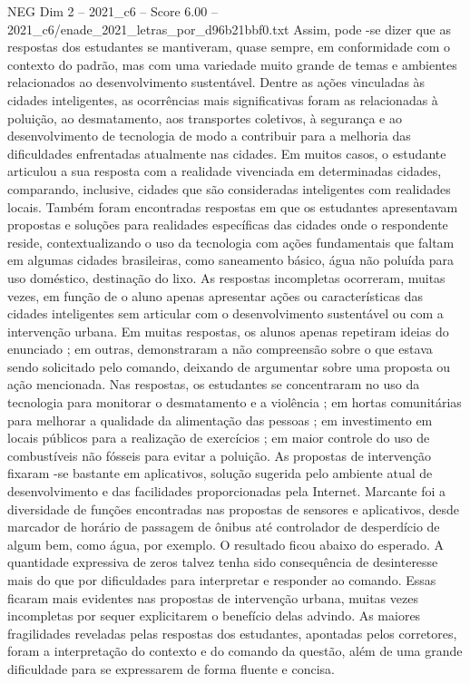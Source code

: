 \begin{textsample}{NEG Dim 2 – 2021\_c6 – Score 6.00 – 2021\_c6/enade\_2021\_letras\_por\_d96b21bbf0.txt}
Assim, pode -se dizer que as respostas dos estudantes se mantiveram, quase sempre, em conformidade com o contexto do padrão, mas com uma variedade muito grande de temas e ambientes relacionados ao desenvolvimento sustentável.
Dentre as ações vinculadas às cidades inteligentes, as ocorrências mais significativas foram as relacionadas à poluição, ao desmatamento, aos transportes coletivos, à segurança e ao desenvolvimento de tecnologia de modo a contribuir para a melhoria das dificuldades enfrentadas atualmente nas cidades.
Em muitos casos, o estudante articulou a sua resposta com a realidade vivenciada em determinadas cidades, comparando, inclusive, cidades que são consideradas inteligentes com realidades locais.
Também foram encontradas respostas em que os estudantes apresentavam propostas e soluções para realidades específicas das cidades onde o respondente reside, contextualizando o uso da tecnologia com ações fundamentais que faltam em algumas cidades brasileiras, como saneamento básico, água não poluída para uso doméstico, destinação do lixo.
As respostas incompletas ocorreram, muitas vezes, em função de o aluno apenas apresentar ações ou características das cidades inteligentes sem articular com o desenvolvimento sustentável ou com a intervenção urbana.
Em muitas respostas, os alunos apenas repetiram ideias do enunciado ; em outras, demonstraram a não compreensão sobre o que estava sendo solicitado pelo comando, deixando de argumentar sobre uma proposta ou ação mencionada.
Nas respostas, os estudantes se concentraram no uso da tecnologia para monitorar o desmatamento e a violência ; em hortas comunitárias para melhorar a qualidade da alimentação das pessoas ; em investimento em locais públicos para a realização de exercícios ; em maior controle do uso de combustíveis não fósseis para evitar a poluição.
As propostas de intervenção fixaram -se bastante em aplicativos, solução sugerida pelo ambiente atual de desenvolvimento e das facilidades proporcionadas pela Internet.
Marcante foi a diversidade de funções encontradas nas propostas de sensores e aplicativos, desde marcador de horário de passagem de ônibus até controlador de desperdício de algum bem, como água, por exemplo.
O resultado ficou abaixo do esperado.
A quantidade expressiva de zeros talvez tenha sido consequência de desinteresse mais do que por dificuldades para interpretar e responder ao comando.
Essas ficaram mais evidentes nas propostas de intervenção urbana, muitas vezes incompletas por sequer explicitarem o benefício delas advindo.
As maiores fragilidades reveladas pelas respostas dos estudantes, apontadas pelos corretores, foram a interpretação do contexto e do comando da questão, além de uma grande dificuldade para se expressarem de forma fluente e concisa.

\end{textsample}
